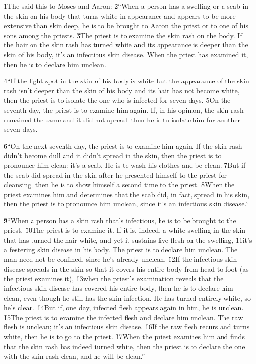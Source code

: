 \v{1}The  said this to Moses and Aaron: \v{2}``When a person has a swelling or a scab in the skin on his body that turns white in appearance and appears to be more extensive than skin deep, he is to be brought to Aaron the priest or to one of his sons among the priests. \v{3}The priest is to examine the skin rash on the body. If the hair on the skin rash has turned white and its appearance is deeper than the skin of his body, it's an infectious skin disease. When the priest has examined it, then he is to declare him unclean.

\v{4}``If the light spot in the skin of his body is white but the appearance of the skin rash isn't deeper than the skin of his body and its hair has not become white, then the priest is to isolate the one who is infected for seven days. \v{5}On the seventh day, the priest is to examine him again. If, in his opinion, the skin rash remained the same and it did not spread, then he is to isolate him for another seven days.

\v{6}``On the next seventh day, the priest is to examine him again. If the skin rash didn't become dull and it didn't spread in the skin, then the priest is to pronounce him clean: it's a scab. He is to wash his clothes and be clean. \v{7}But if the scab did spread in the skin after he presented himself to the priest for cleansing, then he is to show himself a second time to the priest. \v{8}When the priest examines him and determines that the scab did, in fact, spread in his skin, then the priest is to pronounce him unclean, since it's an infectious skin disease.''

\v{9}``When a person has a skin rash that's infectious, he is to be brought to the priest. \v{10}The priest is to examine it. If it is, indeed, a white swelling in the skin that has turned the hair white, and yet it sustains live flesh on the swelling, \v{11}it's a festering skin disease in his body. The priest is to declare him unclean. The man need not be confined, since he's already unclean. \v{12}If the infectious skin disease spreads in the skin so that it covers his entire body from head to foot (as the priest examines it), \v{13}when the priest's examination reveals that the infectious skin disease has covered his entire body, then he is to declare him clean, even though he still has the skin infection. He has turned entirely white, so he's clean. \v{14}But if, one day, infected flesh appears again in him, he is unclean. \v{15}The priest is to examine the infected flesh and declare him unclean. The raw flesh is unclean; it's an infectious skin disease. \v{16}If the raw flesh recurs and turns white, then he is to go to the priest. \v{17}When the priest examines him and finds that the skin rash has indeed turned white, then the priest is to declare the one with the skin rash clean, and he will be clean.''


